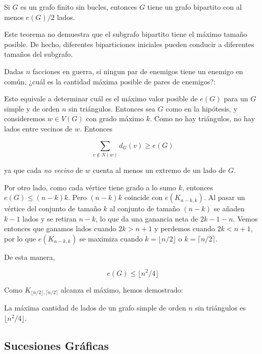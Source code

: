 \begin{teo}
    Si $G$ es un grafo finito sin bucles, entonces $G$ tiene un grafo bipartito con al menos $e(G)/2$ lados.
\end{teo}

\begin{nota}
    Este teorema no demuestra que el subgrafo bipartito tiene el máximo tamaño posible. De hecho, diferentes biparticiones iniciales pueden conducir a diferentes tamaños del subgrafo.
\end{nota}

\begin{prob}
    Dadas $n$ facciones en guerra, si ningun par de enemigos tiene un enemigo en común, ¿cuál es la cantidad máxima posible de pares de enemigos?:
    
    Esto equivale a determinar cuál es el máximo valor posible de $e(G)$ para un $G$ simple y de orden $n$ sin triángulos. Entonces sea $G$ como en la hipótesis, y consideremos $w \in V(G)$ con grado máximo $k$. Como no hay triángulos, no hay lados entre vecinos de $w$. Entonces
        
    \[
    \sum_{v \notin N(w)} d_G(v) \geq e(G)
    \]
    
    \noindent ya que cada \textit{no vecino} de $w$ cuenta al menos un extremo de un lado de $G$.
    
    Por otro lado, como cada vértice tiene grado a lo sumo $k$, entonces $e(G) \leq (n-k)k$. Pero $(n-k)k$ coincide con $e(K_{n-k,k})$. Al pasar un vértice del conjunto de tamaño $k$ al conjunto de tamaño $(n-k)$ se añaden $k-1$ lados y se retiran $n-k$, lo que da una ganancia neta de $2k-1-n$. Vemos entonces que ganamos lados cuando $2k > n + 1$ y perdemos cuando $2k < n + 1$, por lo que $e(K_{n-k,k})$ se maximiza cuando $k = \lfloor n/2 \rfloor$ o $k = \lceil n/2 \rceil$.
    
    De esta manera,
    
    \[
    e(G) \leq \lfloor n^2/4 \rfloor
    \]
\end{prob}

Como $K_{\lfloor n/2 \rfloor, \lceil n/2 \rceil}$ alcanza el máximo, hemos demostrado:

\begin{teo}[Mantel, 1972]
    La máxima cantidad de lados de un grafo simple de orden $n$ sin triángulos es $\lfloor n^2/4 \rfloor$.
\end{teo}

\subsection{Sucesiones Gráficas}

